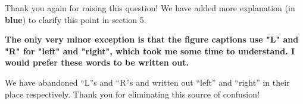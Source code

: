 \documentclass[11pt]{article}
\newcommand{\reviewerTwo}[1]{{\color{azure}\textbf{#1}}}
\begin{document}
Thank you again for raising this question! We have added more explanation (in \reviewerTwo{blue}) to clarify this point in section 5.
\vspace{0.2in}

\reviewerTwo{The only very minor exception is that the figure captions use "L" and "R" for "left" and "right", which took me some time to understand. I would prefer these words to be written out.
}

We have abandoned ``L''s and ``R''s and written out ``left'' and ``right'' in their place respectively. Thank you for eliminating this source of confusion! 


\end{document}
